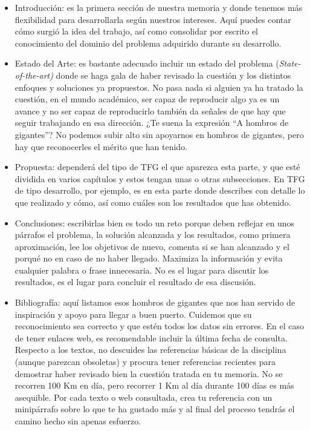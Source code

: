 \begin{itemize}
    \item Introducción: es la primera sección de nuestra memoria y donde tenemos más flexibilidad para desarrollarla según nuestros intereses. Aquí puedes contar cómo surgió la idea del trabajo, así como consolidar por escrito el conocimiento del dominio del problema adquirido durante su desarrollo. 
    \item Estado del Arte: es bastante adecuado incluir un estado del problema (\textit{State-of-the-art)} donde se haga gala de haber revisado la cuestión y los distintos enfoques y soluciones ya propuestos. No pasa nada si alguien ya ha tratado la cuestión, en el mundo académico, ser capaz de reproducir algo ya es un avance y no ser capaz de reproducirlo también da señales de que hay que seguir trabajando en esa dirección. ¿Te suena la expresión ``A hombros de gigantes''? No podemos subir alto sin apoyarnos en hombros de gigantes, pero hay que reconocerles el mérito que han tenido.
    
    \item Propuesta: dependerá del tipo de TFG el que aparezca esta parte, y que esté dividida en varios capítulos y estos tengan unas o otras subsecciones. En TFG de tipo desarrollo, por ejemplo, es en esta parte donde describes con detalle lo que realizado y cómo, así como cuáles son los resultados que has obtenido. 

    \item Conclusiones: escribirlas bien es todo un reto porque deben reflejar en unos párrafos el problema, la solución alcanzada y los resultados, como primera aproximación, lee los objetivos de nuevo, comenta si se han alcanzado y el porqué no en caso de no haber llegado. Maximiza la información y evita cualquier palabra o frase innecesaria. No es el lugar para discutir los resultados, es el lugar para concluir el resultado de esa discusión. 

    \item Bibliografía: aquí listamos esos hombros de gigantes que nos han servido de inspiración y apoyo para llegar a buen puerto. Cuidemos que su reconocimiento sea correcto y que estén todos los datos sin errores. En el caso de tener enlaces web, es recomendable incluir la última fecha de consulta. Respecto a los textos, no descuides las referencias básicas de la disciplina (aunque parezcan obsoletas) y procura tener referencias recientes para demostrar haber revisado bien la cuestión tratada en tu memoria. No se recorren 100 Km en día, pero recorrer 1 Km al día durante 100 días es más asequible. Por cada texto o web consultada, crea tu referencia con un minipárrafo sobre lo que te ha gustado más y al final del proceso tendrás el camino hecho sin apenas esfuerzo.
    
\end{itemize}

